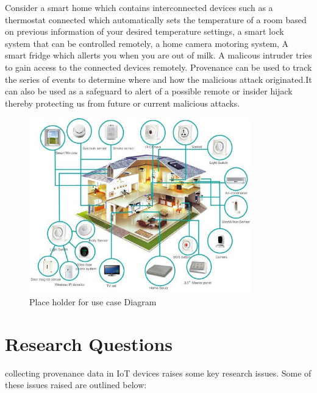 Consider a smart home which contains interconnected devices such as a thermostat connected which automatically sets the temperature of a room based on previous information of your desired temperature settings, a smart lock system that can be controlled remotely, a home camera motoring system, A smart fridge which allerts you when you are out of milk. A malicous intruder tries to gain access to the connected devices remotely. Provenance can be used to track the series  of events to determine where and how the malicious attack originated.It can also be used as a safeguard to alert of a possible remote or insider hijack thereby protecting us from future or current malicious attacks.

\begin{figure}[h]
\begin{center}

\includegraphics[height=3in]{smarthome-diagram.png}
\end{center}
\caption{Place holder for use case Diagram}

\end{figure}




\section{Research Questions}
collecting provenance data in IoT devices raises some key research issues. Some of these issues raised are outlined below:


